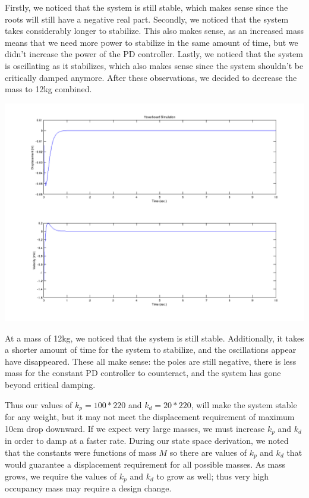 \documentclass[titlepage]{article}
\begin{document}
Firstly, we noticed that the system is still stable, which makes sense since the roots will still have a
negative real part. Secondly, we noticed that the system takes considerably longer to stabilize. This also makes sense, as an increased mass means that we need more power to stabilize in the same amount of time, but we didn't increase the power of the PD controller. Lastly, we noticed
that the system is oscillating as it stabilizes, which also makes sense since the system shouldn't be critically damped anymore. After these observations, we decided to decrease the mass to 12kg combined.

\includegraphics[scale=0.5]{mguy12k_p100120k_d20120.png}

At a mass of 12kg, we noticed that the system is still stable. Additionally, it takes a shorter amount of time for the system to stabilize, and the oscillations appear have disappeared. These all make sense: the poles are still negative, there is less mass for the constant PD controller to counteract, and the system has gone beyond critical damping.

Thus our values of $k_p = 100*220$ and $k_d = 20*220$,  will make the system stable for any weight, but it may not meet the displacement requirement of maximum 10cm drop downward. If we expect very large masses, we must increase $k_p$ and $k_d$ in order to damp at a faster rate. During our state space derivation, we noted that the constants were functions of mass $M$ so there are values of $k_p$ and $k_d$ that would guarantee a displacement requirement for all possible masses. As mass grows, we require the values of $k_p$ and $k_d$ to grow as well; thus very high occupancy mass may require a design change.
\end{document}
